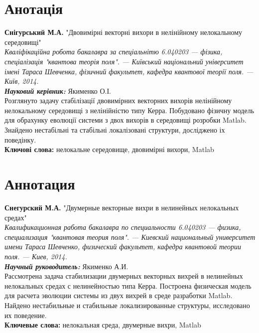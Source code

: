 \newpage
{}
\section*{Анотація}

  {\bf Снігурський М.А.} "Двовимірні векторні вихори в нелінійному нелокальному середовищі"\\
  {\itshape Кваліфікаційна робота бакалавра за спеціальнітю 6.040203 --- фізика, спеціалізація "квантова теорія поля". --- Київський національний університет імені Тараса Шевченка, фізичний факультет, кафедра квантової теорії поля. --- Київ, 2014.\\}
  {\itshape \bfseries Науковий керівник:} Якименко О.І.\\%

  Розглянуто задачу стабілізації двовимірних векторних вихорів нелінійному нелокальному середовищі з нелінійністю типу Керра. Побудовано фізичну модель для обрахунку еволюції системи з двох вихорів в середовищі розробки Matlab. Знайдено нестабільні та стабільні  локалізовані структури, досліджено іх поведінку. \\[1.5cm]
  {\bf Ключові слова:} нелокальне середовище, двовимірні вихори, Matlab\\

\section*{Аннотация}

  {\bf Снегурский М.А.} "Двумерные векторные вихри в нелинейных нелокальных средах"\\
  {\itshape Квалификационная работа бакалавра по специальности 6.040203 --- физика, специализация "квантовая теория поля". --- Киевский национальный университет имени Тараса Шевченко, физический факультет, кафедра квантовой теории поля. --- Киев, 2014.\\}
  {\itshape \bfseries Научный руководитель:} Якименко А.И.\\%

  Рассмотрена задача стабилизации двумерных векторных вихрей в нелинейных нелокальных средах с нелинейностью типа Керра. Построена физическая модель для расчета эволюции системы из двух вихрей в среде разработки Matlab. Найдено нестабильные и стабильные локализированные структуры, исследовано их поведение.\\[1.5cm]
  {\bf Ключевые слова:} нелокальная среда, двумерные вихри, Matlab\\

